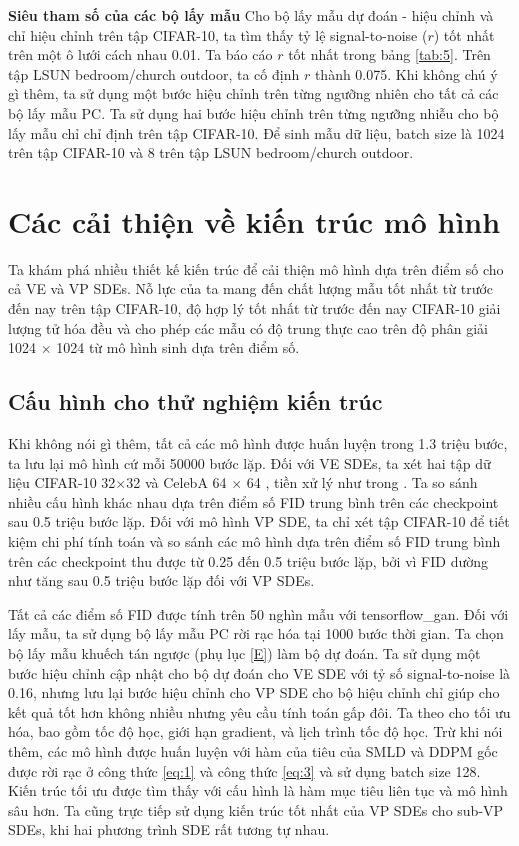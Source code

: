 \documentclass{article} %
\begin{document}
\textbf{Siêu tham số của các bộ lấy mẫu} Cho bộ lấy mẫu dự đoán - hiệu chỉnh và chỉ hiệu chỉnh trên tập CIFAR-10, ta tìm thấy tỷ lệ signal-to-noise ($r$) tốt nhất trên một ô lưới cách nhau 0.01.
Ta báo cáo $r$ tốt nhất trong bảng \ref{tab:5}.
Trên tập LSUN bedroom/church outdoor, ta cố định $r$ thành 0.075.
Khi không chú ý gì thêm, ta sử dụng một bước hiệu chỉnh trên từng ngưỡng nhiên cho tất cả các bộ lấy mẫu PC.
Ta sử dụng hai bước hiệu chỉnh trên từng ngưỡng nhiễu cho bộ lấy mẫu chỉ chỉ định trên tập CIFAR-10.
Để sinh mẫu dữ liệu, batch size là 1024 trên tập CIFAR-10 và 8 trên tập LSUN bedroom/church outdoor.

\section{Các cải thiện về kiến trúc mô hình} \label{H}

Ta khám phá nhiều thiết kế kiến trúc để cải thiện mô hình dựa trên điểm số cho cả VE và VP SDEs.
Nỗ lực của ta mang đến chất lượng mẫu tốt nhất từ trước đến nay trên tập CIFAR-10, độ hợp lý tốt nhất từ trước đến nay CIFAR-10 giải lượng tử hóa đều và cho phép các mẫu có độ trung thực cao trên độ phân giải 1024 $\times$ 1024 từ mô hình sinh dựa trên điểm số.

\subsection{Cấu hình cho thử nghiệm kiến trúc} \label{H.1}

Khi không nói gì thêm, tất cả các mô hình được huấn luyện trong 1.3 triệu bước, ta lưu lại mô hình cứ mỗi 50000 bước lặp.
Đối với VE SDEs, ta xét hai tập dữ liệu CIFAR-10 32$\times$32 \citep{krizhevsky2009learning} và CelebA 64 $\times$ 64 \citep{liu2015deep}, tiền xử lý như trong \citep{song2019generative}.
Ta so sánh nhiều cấu hình khác nhau dựa trên điểm số FID trung bình trên các checkpoint sau 0.5 triệu bước lặp.
Đối với mô hình VP SDE, ta chỉ xét tập CIFAR-10 để tiết kiệm chi phí tính toán và so sánh các mô hình dựa trên điểm số FID trung bình trên các checkpoint thu được từ 0.25 đến 0.5 triệu bước lặp, bởi vì FID dường như tăng sau 0.5 triệu bước lặp đối với VP SDEs.

Tất cả các điểm số FID được tính trên 50 nghìn mẫu với tensorflow\_gan.
Đối với lấy mẫu, ta sử dụng bộ lấy mẫu PC rời rạc hóa tại 1000 bước thời gian.
Ta chọn bộ lấy mẫu khuếch tán ngược (phụ lục \ref{E}) làm bộ dự đoán.
Ta sử dụng một bước hiệu chỉnh cập nhật cho bộ dự đoán cho VE SDE với tỷ số signal-to-noise là 0.16,
nhưng lưu lại bước hiệu chỉnh cho VP SDE cho bộ hiệu chỉnh chỉ giúp cho kết quả tốt hơn không nhiều nhưng yêu cầu tính toán gấp đôi.
Ta theo \citep{ho2020denoising} cho tối ưu hóa, bao gồm tốc độ học, giới hạn gradient, và lịch trình tốc độ học.
Trừ khi nói thêm, các mô hình được huấn luyện với hàm của tiêu của SMLD và DDPM gốc được rời rạc ở công thức \ref{eq:1} và công thức \ref{eq:3} và sử dụng batch size 128.
Kiến trúc tối ưu được tìm thấy với cấu hình là hàm mục tiêu liên tục và mô hình sâu hơn.
Ta cũng trực tiếp sử dụng kiến trúc tốt nhất của VP SDEs cho sub-VP SDEs, khi hai phương trình SDE rất tương tự nhau.
\end{document}
